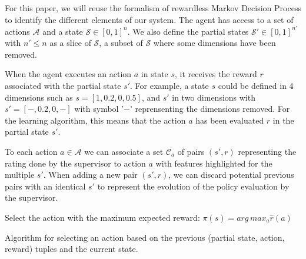 \documentclass[letterpaper]{article} %
\begin{document}
For this paper, we will reuse the formalism of rewardless Markov Decision
Process to identify the different elements of our system. The agent has access
to a set of actions $\mathcal{A}$ and a state $\mathcal{S} \in [0,1]^{n}$. We
also define the partial states $\mathcal{S'} \in [0,1]^{n'}$ with $n' \leq n$ as
a slice of $\mathcal{S}$, a subset of $\mathcal{S}$ where some dimensions have
been removed. 

When the agent executes an action $a$ in state $s$, it receives the reward $r$
associated with the partial state $s'$. For example, a state $s$ could be
defined in 4 dimensions such as ${s=[1,0.2,0,0.5]}$, and $s'$ in two dimensions
with ${s'=[-,0.2,0,-]}$ with symbol '$-$' reprensenting the dimensions removed.
For the learning algorithm, this means that the action $a$ has been evaluated
$r$ in the partial state $s'$.  

To each action $a \in \mathcal{A}$ we can associate a set $\mathcal{C}_{a}$ of
pairs $(s',r)$ representing the rating done by the supervisor to action $a$ with
features highlighted for the multiple $s'$. When adding a new pair $(s',r)$, we
can discard potential previous pairs with an identical $s'$ to represent the
evolution of the policy evaluation by the supervisor.

\begin{algorithm}
    \DontPrintSemicolon
    Select the action with the maximum expected reward:
    $\pi(s) = arg\, max_{a} \hat{r}(a)$

    \caption{Algorithm for selecting an action based on the previous
    (partial state, action, reward) tuples and the current state.}
    \label{algo}
\end{algorithm}
\end{document}

